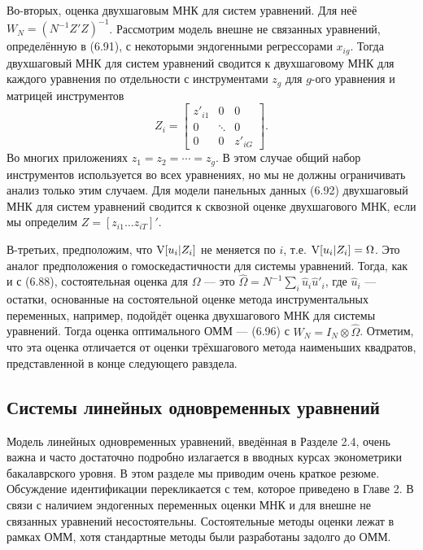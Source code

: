 Во-вторых, оценка двухшаговым МНК для систем уравнений.  Для неё $W_N=(N^{-1} Z' Z)^{-1}$. Рассмотрим модель внешне не связанных уравнений, определённую в (6.91), с некоторыми эндогенными регрессорами $x_{ig}$. Тогда двухшаговый МНК для систем уравнений сводится к двухшаговому МНК для каждого уравнения по отдельности с инструментами $z_g$ для $g$-ого уравнения и матрицей инструментов
\begin{equation}
Z_i= \begin{bmatrix} z'_{i1} & 0 & 0 \\ 0 & \ddots & 0 \\ 0 & 0 & z'_{iG} \end{bmatrix}.
\end{equation}
Во многих приложениях $z_1=z_2= \cdots = z_g$. В этом случае общий набор инструментов используется во всех уравнениях, но мы не должны ограничивать анализ только этим случаем. Для модели панельных данных (6.92) двухшаговый МНК для систем уравнений сводится к сквозной оценке двухшагового МНК, если мы определим $Z=[z_{i1} \dots z_{iT}]'$.

В-третьих, предположим, что $\mathrm{V}[u_i|Z_i]$ не меняется по $i$, т.е. $\mathrm{V}[u_i|Z_i]=\Omega$. Это аналог предположения о гомоскедастичности для системы уравнений. Тогда, как и с (6.88), состоятельная оценка для $\Omega$ --- это $\hat{\Omega}=N^{-1} \sum_i \hat{u}_i \hat{u}'_i$, где $\hat{u}_i$ --- остатки, основанные на состоятельной оценке метода инструментальных переменных, например, подойдёт оценка двухшагового МНК для системы уравнений. Тогда оценка оптимального ОММ --- (6.96) с $W_N = I_N \otimes \hat{\Omega}$. Отметим, что эта оценка отличается от оценки трёхшагового метода наименьших квадратов, представленной в конце следующего равздела.

\subsection{Системы линейных одновременных уравнений}

Модель линейных одновременных уравнений, введённая в Разделе 2.4, очень важна и часто достаточно подробно излагается в вводных курсах эконометрики бакалаврского уровня. В этом разделе мы приводим очень краткое резюме. Обсуждение идентификации перекликается с тем, которое приведено в Главе 2. В связи с наличием эндогенных переменных оценки МНК и для внешне не связанных уравнений несостоятельны. Состоятельные методы оценки лежат в рамках ОММ, хотя стандартные методы были разработаны задолго до ОММ.

